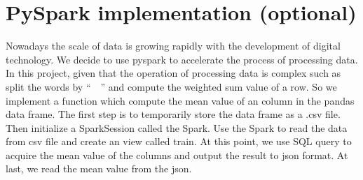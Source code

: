 \documentclass{article}
\begin{document}
\section{PySpark implementation (optional)}
Nowadays the scale of data is growing rapidly with the development of digital technology. We decide to use pyspark to accelerate the process of  processing data. In this project, given that the operation of processing data is complex such as split the words by “~~” and compute the weighted sum value of a row. So we implement a function which compute the mean value of an column in the pandas data frame. The first step is to temporarily store the data frame as a .csv file. Then initialize a SparkSession called the Spark. Use the Spark to read the data from csv file and create an view called train. At this point, we use  SQL query to acquire the mean value of the columns and output the result to json format. At last, we read the mean value from the json. 
\end{document}
